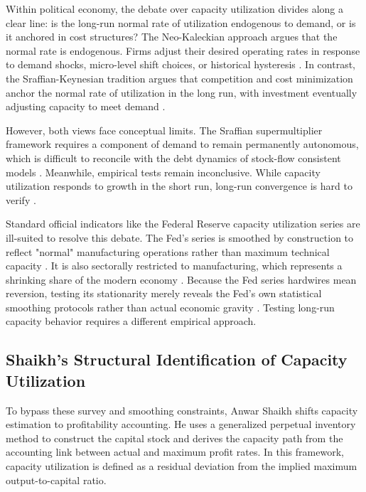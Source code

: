 \documentclass[11pt]{article}
\begin{document}
Within political economy, the debate over capacity utilization divides along a clear line: is the long-run normal rate of utilization endogenous to demand, or is it anchored in cost structures? The Neo-Kaleckian approach argues that the normal rate is endogenous. Firms adjust their desired operating rates in response to demand shocks, micro-level shift choices, or historical hysteresis \citep{Lavoie1995, Nikiforos2013, Setterfield2020}. In contrast, the Sraffian-Keynesian tradition argues that competition and cost minimization anchor the normal rate of utilization in the long run, with investment eventually adjusting capacity to meet demand \citep{Ciccone1986}.

However, both views face conceptual limits. The Sraffian supermultiplier framework requires a component of demand to remain permanently autonomous, which is difficult to reconcile with the debt dynamics of stock-flow consistent models \citep{Nikiforos2018}. Meanwhile, empirical tests remain inconclusive. While capacity utilization responds to growth in the short run, long-run convergence is hard to verify \citep{GahnGonzalez2022}.

Standard official indicators like the Federal Reserve capacity utilization series are ill-suited to resolve this debate. The Fed's series is smoothed by construction to reflect "normal" manufacturing operations rather than maximum technical capacity \citep{Shapiro1989}. It is also sectorally restricted to manufacturing, which represents a shrinking share of the modern economy \citep{Haluska2023}. Because the Fed series hardwires mean reversion, testing its stationarity merely reveals the Fed's own statistical smoothing protocols rather than actual economic gravity \citep{Nikiforos2016, Nikiforos2021}. Testing long-run capacity behavior requires a different empirical approach.

\subsection{Shaikh's Structural Identification of Capacity Utilization}
\label{subsec:shaikh_structural_measurement}

To bypass these survey and smoothing constraints, Anwar Shaikh \citep{Shaikh2016} shifts capacity estimation to profitability accounting. He uses a generalized perpetual inventory method to construct the capital stock and derives the capacity path from the accounting link between actual and maximum profit rates. In this framework, capacity utilization is defined as a residual deviation from the implied maximum output-to-capital ratio.
\end{document}
